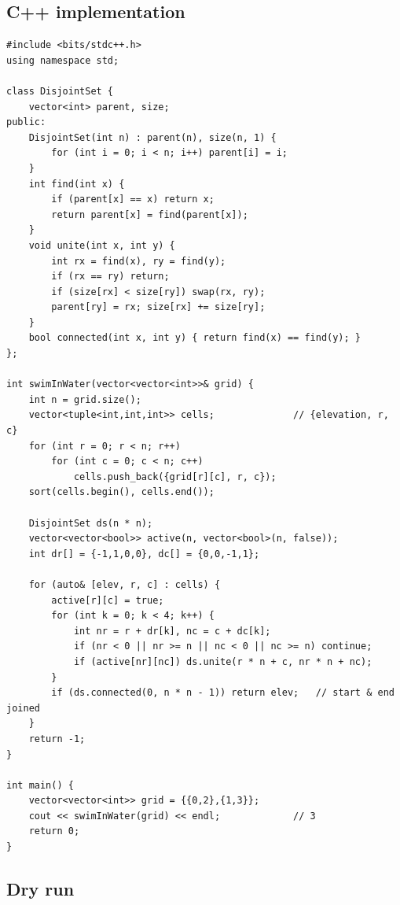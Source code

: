\subsection*{C++ implementation}

\begin{lstlisting}
#include <bits/stdc++.h>
using namespace std;

class DisjointSet {
    vector<int> parent, size;
public:
    DisjointSet(int n) : parent(n), size(n, 1) {
        for (int i = 0; i < n; i++) parent[i] = i;
    }
    int find(int x) {
        if (parent[x] == x) return x;
        return parent[x] = find(parent[x]);
    }
    void unite(int x, int y) {
        int rx = find(x), ry = find(y);
        if (rx == ry) return;
        if (size[rx] < size[ry]) swap(rx, ry);
        parent[ry] = rx; size[rx] += size[ry];
    }
    bool connected(int x, int y) { return find(x) == find(y); }
};

int swimInWater(vector<vector<int>>& grid) {
    int n = grid.size();
    vector<tuple<int,int,int>> cells;              // {elevation, r, c}
    for (int r = 0; r < n; r++)
        for (int c = 0; c < n; c++)
            cells.push_back({grid[r][c], r, c});
    sort(cells.begin(), cells.end());

    DisjointSet ds(n * n);
    vector<vector<bool>> active(n, vector<bool>(n, false));
    int dr[] = {-1,1,0,0}, dc[] = {0,0,-1,1};

    for (auto& [elev, r, c] : cells) {
        active[r][c] = true;
        for (int k = 0; k < 4; k++) {
            int nr = r + dr[k], nc = c + dc[k];
            if (nr < 0 || nr >= n || nc < 0 || nc >= n) continue;
            if (active[nr][nc]) ds.unite(r * n + c, nr * n + nc);
        }
        if (ds.connected(0, n * n - 1)) return elev;   // start & end joined
    }
    return -1;
}

int main() {
    vector<vector<int>> grid = {{0,2},{1,3}};
    cout << swimInWater(grid) << endl;             // 3
    return 0;
}
\end{lstlisting}

\subsection*{Dry run}


